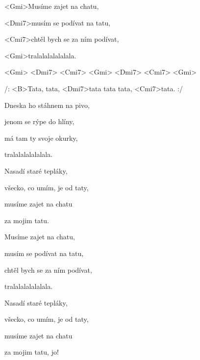 
\zs
<Gmi>Musíme zajet na chatu,

<Dmi7>musím se podívat na tatu,

<Cmi7>chtěl bych se za ním podívat,

<Gmi>tralalalalalalala.

<Gmi> <Dmi7> <Cmi7> <Gmi> <Dmi7> <Cmi7>
<Gmi>

\ks
\zr

/: <B>Tata, tata, <Dmi7>tata tata tata, <Cmi7>tata. :/

\kr
\zs
Dneska ho stáhnem na pivo,

jenom se rýpe do hlíny,

má tam ty svoje okurky,

tralalalalalalala.

\ks
\zs

Nasadí staré tepláky,

všecko, co umím, je od taty,

musíme zajet na chatu

za mojim tatu.

\ks
\zs

Musíme zajet na chatu,

musím se podívat na tatu,

chtěl bych se za ním podívat,

tralalalalalalala.

\ks
\zs

Nasadí staré tepláky,

všecko, co umím, je od taty,

musíme zajet na chatu

za mojim tatu, jo!

\ks
\zr

\kr
\kp
